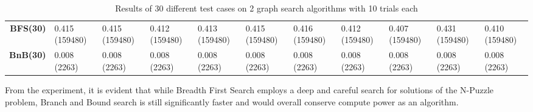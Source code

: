 \begin{table}[ht]
\begin{adjustbox}{width=1.5\textwidth,center}
\begin{tabular}{r|llllllllll}
\textbf{BFS(30)} & 0.415 (159480) & 0.415 (159480) & 0.412 (159480) & 0.413 (159480) & 0.415 (159480) & 0.416 (159480) & 0.412 (159480) & 0.407 (159480) & 0.431 (159480) & 0.410 (159480) \\
\textbf{BnB(30)} & 0.008 (2263) & 0.008 (2263) & 0.008 (2263) & 0.008 (2263) & 0.008 (2263) & 0.008 (2263) & 0.008 (2263) & 0.008 (2263) & 0.008 (2263) & 0.008 (2263) \\

\end{tabular}
\end{adjustbox}

\caption{Results of 30 different test cases on 2 graph search algorithms with 10 trials each}
\end{table}

\par From the experiment, it is evident that while Breadth First Search employs a deep and careful search for solutions of the N-Puzzle problem, Branch and Bound search is still significantly faster and would overall conserve compute power as an algorithm.
